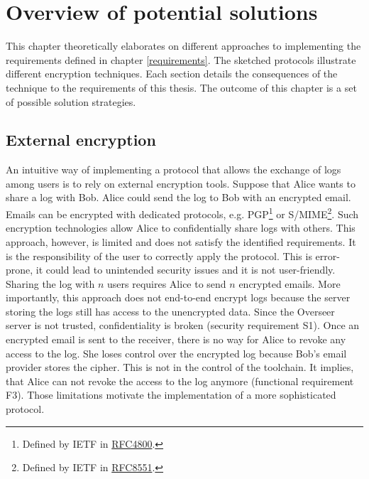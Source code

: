 \documentclass[../main.tex]{subfiles}
\begin{document}
\chapter{Overview of potential solutions}

This chapter theoretically elaborates on different approaches to implementing the requirements defined in chapter \ref{requirements}.
The sketched protocols illustrate different encryption techniques.
Each section details the consequences of the technique to the requirements of this thesis.
The outcome of this chapter is a set of possible solution strategies.

\section{External encryption}
\label{sec:external-encryption}
An intuitive way of implementing a protocol that allows the exchange of logs among users is to rely on external encryption tools.
Suppose that Alice wants to share a log with Bob.
Alice could send the log to Bob with an encrypted email.
Emails can be encrypted with dedicated protocols, e.g. PGP\footnote{Defined by IETF in \href{https://www.rfc-editor.org/rfc/rfc4880}{RFC4800}.} or S/MIME\footnote{Defined by IETF in \href{https://www.rfc-editor.org/rfc/rfc8551.html}{RFC8551}.}.
Such encryption technologies allow Alice to confidentially share logs with others.
This approach, however, is limited and does not satisfy the identified requirements.
It is the responsibility of the user to correctly apply the protocol.
This is error-prone, it could lead to unintended security issues and it is not user-friendly.
Sharing the log with $n$ users requires Alice to send $n$ encrypted emails.
More importantly, this approach does not end-to-end encrypt logs because the server storing the logs still has access to the unencrypted data.
Since the Overseer server is not trusted, confidentiality is broken (security requirement S1).
Once an encrypted email is sent to the receiver, there is no way for Alice to revoke any access to the log.
She loses control over the encrypted log because Bob's email provider stores the cipher.
This is not in the control of the toolchain.
It implies, that Alice can not revoke the access to the log anymore (functional requirement F3).
Those limitations motivate the implementation of a more sophisticated protocol.
\end{document}

